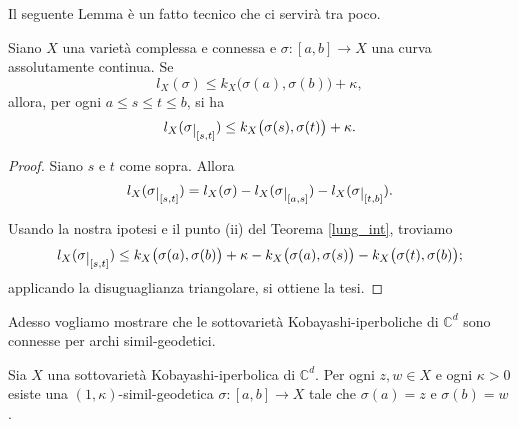 Il seguente Lemma è un fatto tecnico che ci servirà tra poco.

\begin{lm} \label{restrdis}
    Siano $X$ una varietà complessa e connessa e $\sigma:[a,b] \longrightarrow X$ una curva assolutamente continua. Se
    $$l_X(\sigma) \le k_X\big(\sigma(a),\sigma(b)\big)+\kappa,$$
    allora, per ogni $a \le s \le t \le b$, si ha
    $$l_X(\sigma\restrict{[s,t]}) \le k_X\big(\sigma(s),\sigma(t)\big)+\kappa.$$
\end{lm}

\begin{proof}
    Siano $s$ e $t$ come sopra. Allora
    $$l_X(\sigma\restrict{[s,t]})=l_X(\sigma)-l_X(\sigma\restrict{[a,s]})-l_X(\sigma\restrict{[t,b]}).$$

    Usando la nostra ipotesi e il punto (ii) del Teorema \ref{lung_int}, troviamo
    $$l_X(\sigma\restrict{[s,t]}) \le k_X\big(\sigma(a),\sigma(b)\big)+\kappa-k_X\big(\sigma(a),\sigma(s)\big)-k_X\big(\sigma(t),\sigma(b)\big);$$
    applicando la disuguaglianza triangolare, si ottiene la tesi.
\end{proof}

 Adesso vogliamo mostrare che le sottovarietà Kobayashi-iperboliche di $\mathbb{C}^d$ sono connesse per archi simil-geodetici.

\begin{thm} \label{similgeo_conn}
    Sia $X$ una sottovarietà Kobayashi-iperbolica di $\mathbb{C}^d$. Per ogni $z,w \in X$ e ogni $\kappa>0$ esiste una $(1,\kappa)$-simil-geodetica $\sigma:[a,b]\longrightarrow X$ tale che $\sigma(a)=z$ e $\sigma(b)=w$.
\end{thm}

